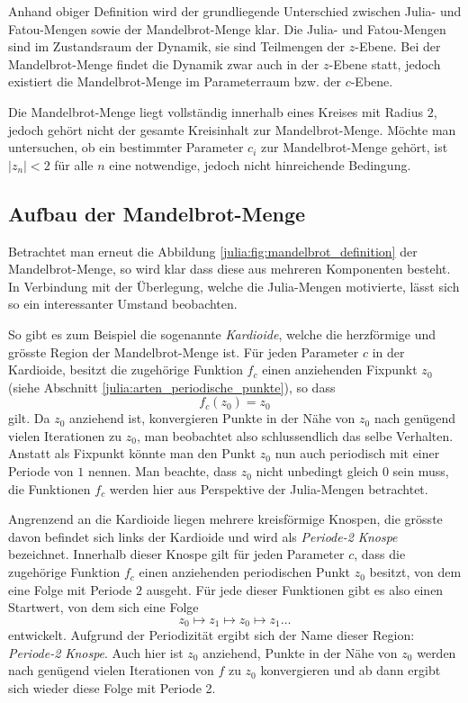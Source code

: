 Anhand obiger Definition wird der grundliegende Unterschied zwischen Julia- und Fatou-Mengen sowie der Mandelbrot-Menge klar.
Die Julia- und Fatou-Mengen sind im Zustandsraum der Dynamik, sie sind Teilmengen der $z$-Ebene.
Bei der Mandelbrot-Menge findet die Dynamik zwar auch in der $z$-Ebene statt, jedoch existiert die Mandelbrot-Menge im Parameterraum bzw. der $c$-Ebene.

Die Mandelbrot-Menge liegt vollständig innerhalb eines Kreises mit Radius $2$, jedoch gehört nicht der gesamte Kreisinhalt zur Mandelbrot-Menge.
Möchte man untersuchen, ob ein bestimmter Parameter $c_i$ zur Mandelbrot-Menge gehört, ist $|z_n| < 2$ für alle $n$ eine notwendige, jedoch nicht hinreichende Bedingung.

\subsection{Aufbau der Mandelbrot-Menge}
\label{julia:aufbau_mandel}
Betrachtet man erneut die Abbildung \ref{julia:fig:mandelbrot_definition} der Mandelbrot-Menge, so wird klar dass diese aus mehreren Komponenten besteht.
In Verbindung mit der Überlegung, welche die Julia-Mengen motivierte, lässt sich so ein interessanter Umstand beobachten.

So gibt es zum Beispiel die sogenannte \emph{Kardioide}, welche die herzförmige und grösste Region der Mandelbrot-Menge ist.
%
Für jeden Parameter $c$ in der Kardioide, besitzt die zugehörige Funktion $f_c$ einen anziehenden Fixpunkt $z_0$ (siehe Abschnitt \ref{julia:arten_periodische_punkte}), so dass
\begin{equation*}
    f_c(z_0) = z_0
\end{equation*}
gilt.
Da $z_0$ anziehend ist, konvergieren Punkte in der Nähe von $z_0$ nach genügend vielen Iterationen zu $z_0$, man beobachtet also schlussendlich das selbe Verhalten.
Anstatt als Fixpunkt könnte man den Punkt $z_0$ nun auch periodisch mit einer Periode von $1$ nennen.
Man beachte, dass $z_0$ nicht unbedingt gleich $0$ sein muss, die Funktionen $f_c$ werden hier aus Perspektive der Julia-Mengen betrachtet.

Angrenzend an die Kardioide liegen mehrere kreisförmige Knospen, die grösste davon befindet sich links der Kardioide und wird als \emph{Periode-2 Knospe} bezeichnet.
%
%
Innerhalb dieser Knospe gilt für jeden Parameter $c$, dass die zugehörige Funktion $f_c$ einen anziehenden periodischen Punkt $z_0$ besitzt, von dem eine Folge mit Periode $2$ ausgeht.
Für jede dieser Funktionen gibt es also einen Startwert, von dem sich eine Folge
\begin{equation*}
    z_0 \mapsto z_1 \mapsto z_0 \mapsto z_1 \ldots
\end{equation*}
entwickelt.
Aufgrund der Periodizität ergibt sich der Name dieser Region: \emph{Periode-2 Knospe}.
Auch hier ist $z_0$ anziehend, Punkte in der Nähe von $z_0$ werden nach genügend vielen Iterationen von $f$ zu $z_0$ konvergieren und ab dann ergibt sich wieder diese Folge mit Periode 2.

